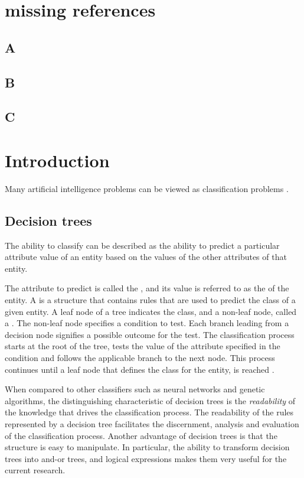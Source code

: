 \chapter{missing references}
\section{A}\label{sec:encoding_examples}
\section{B}\label{sec:language-symbol}
\section{C}\label{tab:attribute_regions}

\chapter{Introduction}
Many artificial intelligence problems can be viewed as classification problems \cite{wagacha:trees}.
\section{Decision trees}
\label{sec:decision_tree}   
 The ability to classify can be described as the ability to predict a particular attribute value of an entity based on the values of the other attributes of that entity.  

  The attribute to predict is called the , and its value is referred to as the  of the entity. A  is a structure that contains rules that are used to predict the class of a given entity.  A leaf node of a tree indicates the class, and a non-leaf node, called a . The non-leaf node specifies a condition to test. Each branch leading from a decision node signifies a possible outcome for the test.  The classification process starts at the root of the tree, tests the value of the attribute specified in the condition and follows the applicable branch to the next node. This process continues until a leaf node that defines the class for the entity, is reached \cite{jackson:learning}.

When compared to other classifiers such as neural networks and genetic algorithms, the distinguishing characteristic of decision trees is the {\sl readability} of the knowledge that drives the classification process.  The readability of the rules represented by a decision tree facilitates the discernment, analysis and evaluation of the classification process.  Another advantage of decision trees is that the structure is easy to manipulate.  In particular, the ability to transform decision trees into and-or trees, and logical expressions makes them very useful for the current research.

